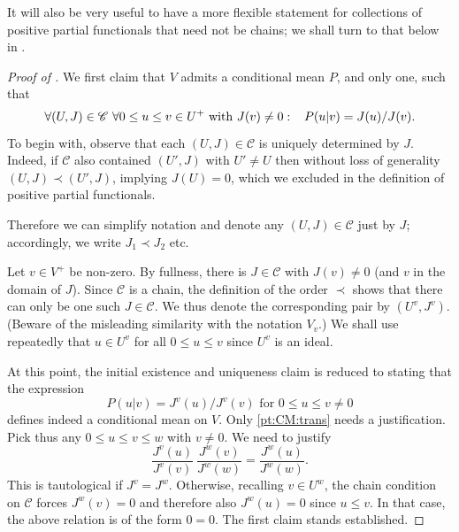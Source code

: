 \documentclass[11pt]{amsart}
\numberwithin{equation}{section}
\theoremstyle{definition}
\theoremstyle{definition}
\newcommand*{\sC}{\mathscr{C}}
\begin{document}
It will also be very useful to have a more flexible statement for collections of positive partial functionals that need not be chains; we shall turn to that below in .

\begin{proof}[Proof of ]
We first claim that $V$ admits a conditional mean $P$, and only one, such that
\begin{equation*}
\forall (U, J) \in \sC \ \forall 0\leq u\leq v\in U^+\ \text{with } J(v) \neq 0 :\kern3mm P(u|v) = J(u) / J(v).
\end{equation*}
To begin with, observe that each $(U,J)\in\sC$ is uniquely determined by $J$. Indeed, if $\sC$ also contained $(U', J)$ with $U'\neq U$ then without loss of generality $(U, J) \prec (U', J)$, implying $J(U)=0$, which we excluded in the definition of positive partial functionals.

Therefore we can simplify notation and denote any $(U,J)\in \sC$ just by $J$; accordingly, we write $J_1\prec J_2$ etc.

Let $v\in V^+$ be non-zero. By fullness, there is $J \in \sC$ with $J(v) \neq 0$ (and $v$ in the domain of $J$). Since $\sC$ is a chain, the definition of the order $\prec$ shows that there can only be one such $J \in \sC$. We thus denote the corresponding pair by $(U^v, J^v)$. (Beware of the misleading similarity with the notation $V_v$.) We shall use repeatedly that $u\in U^v$ for all $0\leq u \leq v$ since $U^v$ is an ideal.

At this point, the initial existence and uniqueness claim is reduced to stating that the expression
\begin{equation*}
 P(u|v) = J^v(u) / J^v(v) \text{ for } 0\leq u\leq v \neq 0
\end{equation*}
defines indeed a conditional mean on $V$. Only \ref{pt:CM:trans} needs a justification. Pick thus any $0\leq u \leq v \leq w$ with $v\neq 0$. We need to justify
\begin{equation*}
\frac{J^v(u)}{J^v(v)} \ \frac{J^w(v)}{J^w(w)} =\frac{J^w(u)}{J^w(w)}.
\end{equation*}
This is tautological if $J^v=J^w$. Otherwise, recalling $v\in U^w$, the chain condition on $\sC$ forces $J^w(v)=0$ and therefore also $J^w(u)=0$ since $u\leq v$. In that case, the above relation is of the form $0=0$. The first claim stands established.


\end{proof}
\end{document}
